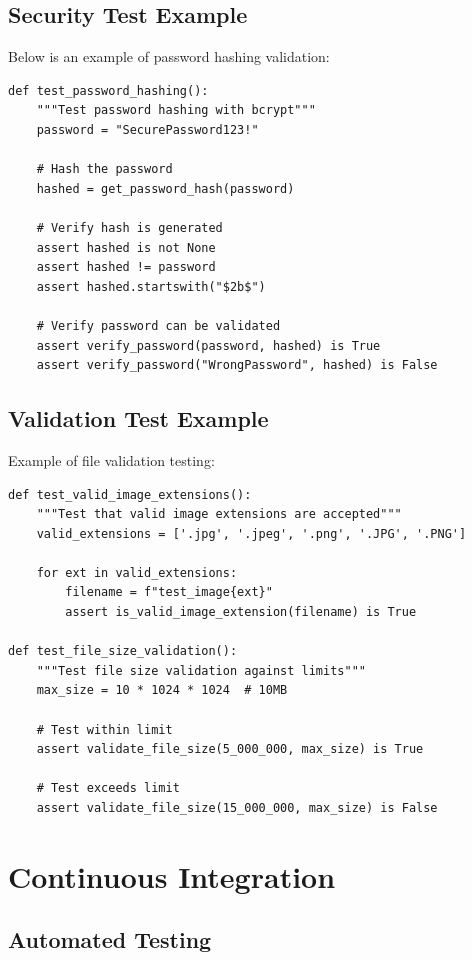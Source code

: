 \documentclass[12pt,a4paper]{article}
\begin{document}
\subsection{Security Test Example}

Below is an example of password hashing validation:

\begin{lstlisting}
def test_password_hashing():
    """Test password hashing with bcrypt"""
    password = "SecurePassword123!"
    
    # Hash the password
    hashed = get_password_hash(password)
    
    # Verify hash is generated
    assert hashed is not None
    assert hashed != password
    assert hashed.startswith("$2b$")
    
    # Verify password can be validated
    assert verify_password(password, hashed) is True
    assert verify_password("WrongPassword", hashed) is False
\end{lstlisting}

\subsection{Validation Test Example}

Example of file validation testing:

\begin{lstlisting}
def test_valid_image_extensions():
    """Test that valid image extensions are accepted"""
    valid_extensions = ['.jpg', '.jpeg', '.png', '.JPG', '.PNG']
    
    for ext in valid_extensions:
        filename = f"test_image{ext}"
        assert is_valid_image_extension(filename) is True

def test_file_size_validation():
    """Test file size validation against limits"""
    max_size = 10 * 1024 * 1024  # 10MB
    
    # Test within limit
    assert validate_file_size(5_000_000, max_size) is True
    
    # Test exceeds limit
    assert validate_file_size(15_000_000, max_size) is False
\end{lstlisting}

\section{Continuous Integration}

\subsection{Automated Testing}
\end{document}
